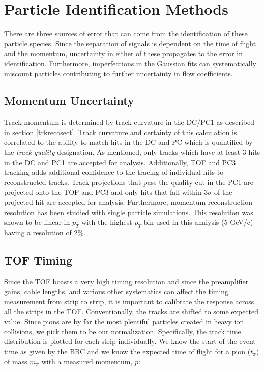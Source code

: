 \section{Particle Identification Methods}
\label{sectpiderr}
There are three sources of error that can come from the identification of these particle species. Since the separation of signals is dependent on the time of flight and the momentum, uncertainty in either of these propagates to the error in identification. Furthermore, imperfections in the Gaussian fits can systematically miscount particles contributing to further uncertainty in flow coefficients.

\subsection{Momentum Uncertainty}
Track momentum is determined by track curvature in the DC/PC1 as described in section \ref{trkrecosect}. Track curvature and certainty of this calculation is correlated to the ability to match hits in the DC and PC which is quantified by the \textit{track quality} designation. As mentioned, only tracks which have at least 3 hits in the DC and PC1 are accepted for analysis. Additionally, TOF and PC3 tracking adds additional confidence to the tracing of individual hits to reconstructed tracks. Track projections that pass the quality cut in the PC1 are projected onto the TOF and PC3 and only hits that fall within $3\sigma$ of the projected hit are accepted for analysis. Furthermore, momentum reconstruction resolution has been studied with single particle simulations\citep{Mitchell:2002wu}. This resolution was shown to be linear in $p_T$ with the highest $p_T$ bin used in this analysis (5 GeV/c) having a resolution of 2\%.
 
\subsection{TOF Timing}
Since the TOF boasts a very high timing resolution and since the preamplifier gains, cable lengths, and various other systematics can affect the timing measurement from strip to strip, it is important to calibrate the response across all the strips in the TOF. Conventionally, the tracks are shifted to some expected value. Since pions are by far the most plentiful particles created in heavy ion collisions, we pick them to be our normalization. Specifically, the track time distribution is plotted for each strip individually. We know the start of the event time as given by the BBC and we know the expected time of flight for a pion ($t_{\pi}$) of mass $m_{\pi}$ with a measured momentum, $p$:

